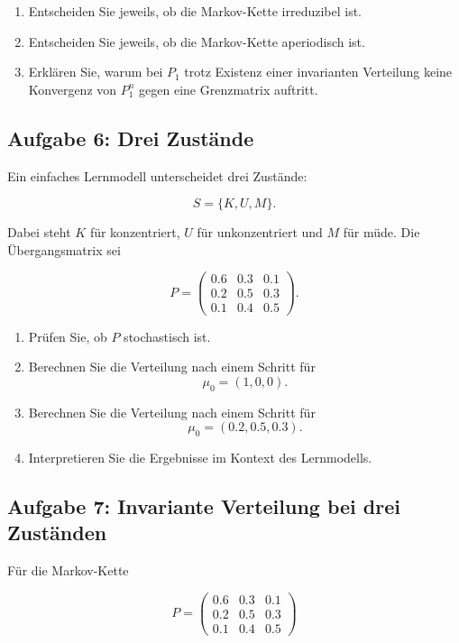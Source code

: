 \documentclass[11pt,a4paper]{article}
\begin{document}
\begin{enumerate}
    \item Entscheiden Sie jeweils, ob die Markov-Kette irreduzibel ist.
    \item Entscheiden Sie jeweils, ob die Markov-Kette aperiodisch ist.
    \item Erklären Sie, warum bei $P_1$ trotz Existenz einer invarianten Verteilung keine Konvergenz von $P_1^n$ gegen eine Grenzmatrix auftritt.
\end{enumerate}

\subsection*{Aufgabe 6: Drei Zustände}

Ein einfaches Lernmodell unterscheidet drei Zustände:

\[
S = \{K,U,M\}.
\]

Dabei steht $K$ für konzentriert, $U$ für unkonzentriert und $M$ für müde. Die Übergangsmatrix sei

\[
P =
\begin{pmatrix}
0.6 & 0.3 & 0.1 \\
0.2 & 0.5 & 0.3 \\
0.1 & 0.4 & 0.5
\end{pmatrix}.
\]

\begin{enumerate}
    \item Prüfen Sie, ob $P$ stochastisch ist.
    \item Berechnen Sie die Verteilung nach einem Schritt für
    \[
    \mu_0 = (1,0,0).
    \]
    \item Berechnen Sie die Verteilung nach einem Schritt für
    \[
    \mu_0 = (0.2,0.5,0.3).
    \]
    \item Interpretieren Sie die Ergebnisse im Kontext des Lernmodells.
\end{enumerate}

\subsection*{Aufgabe 7: Invariante Verteilung bei drei Zuständen}

Für die Markov-Kette

\[
P =
\begin{pmatrix}
0.6 & 0.3 & 0.1 \\
0.2 & 0.5 & 0.3 \\
0.1 & 0.4 & 0.5
\end{pmatrix}
\]
\end{document}
